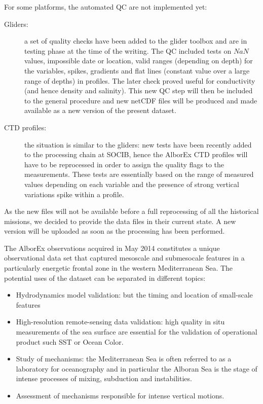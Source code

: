 \documentclass[essd]{copernicus}
\begin{document}
For some platforms, the automated QC are not implemented yet:
\begin{description}
\item[Gliders:] a set of quality checks have been added to the glider toolbox \citep[][and available at \url{https://github.com/socib/glider_toolbox}]{TROUPIN16} and are in testing phase at the time of the writing. The QC included tests on $NaN$ values, impossible date or location, valid ranges (depending on depth) for the variables, spikes, gradients and flat lines (constant value over a large range of depths) in profiles. The later check proved useful for conductivity (and hence density and salinity). This new QC step will then be included to the general procedure and new netCDF files will be produced and made available as a new version of the present dataset.
\item[CTD profiles:] the situation is similar to the gliders: new tests have been recently added to the processing chain at SOCIB, hence the AlborEx CTD profiles will have to be reprocessed in order to assign the quality flags to the measurements. These tests are essentially based on the range of measured values depending on each variable and the presence of strong vertical variations spike within a profile.
\end{description}

As the new files will not be available before a full reprocessing of all the historical missions, we decided to provide the data files in their current state. A new version will be uploaded as soon as the processing has been performed.



The AlborEx observations acquired in May 2014 constitutes a unique observational data set that captured mesoscale and submesocale features in a particularly energetic frontal zone in the western Mediterranean Sea. The potential uses of the dataset can be separated in different topics:
\begin{itemize}
\item Hydrodynamics model validation: but the timing and location of small-scale features 
\item High-resolution remote-sensing data validation: high quality in situ measurements of the sea surface are essential for the validation of operational product such SST or Ocean Color. 
\item Study of mechanisms: the Mediterranean Sea is often referred to as a laboratory for oceanography and in particular the Alboran Sea is the stage of intense processes of mixing, subduction and instabilities.
\item Assessment of mechanisms responsible for intense vertical motions.
\end{itemize} 
\end{document}
